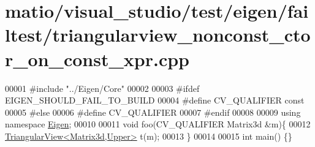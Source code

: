 \hypertarget{matio_2visual__studio_2test_2eigen_2failtest_2triangularview__nonconst__ctor__on__const__xpr_8cpp_source}{}\section{matio/visual\+\_\+studio/test/eigen/failtest/triangularview\+\_\+nonconst\+\_\+ctor\+\_\+on\+\_\+const\+\_\+xpr.cpp}
\label{matio_2visual__studio_2test_2eigen_2failtest_2triangularview__nonconst__ctor__on__const__xpr_8cpp_source}

\begin{DoxyCode}
00001 \textcolor{preprocessor}{#include "../Eigen/Core"}
00002 
00003 \textcolor{preprocessor}{#ifdef EIGEN\_SHOULD\_FAIL\_TO\_BUILD}
00004 \textcolor{preprocessor}{#define CV\_QUALIFIER const}
00005 \textcolor{preprocessor}{#else}
00006 \textcolor{preprocessor}{#define CV\_QUALIFIER}
00007 \textcolor{preprocessor}{#endif}
00008 
00009 \textcolor{keyword}{using namespace }\hyperlink{namespace_eigen}{Eigen};
00010 
00011 \textcolor{keywordtype}{void} foo(CV\_QUALIFIER Matrix3d &m)\{
00012   \hyperlink{group___core___module_class_eigen_1_1_triangular_view}{TriangularView<Matrix3d,Upper>} t(m);
00013 \}
00014 
00015 \textcolor{keywordtype}{int} main() \{\}
\end{DoxyCode}
